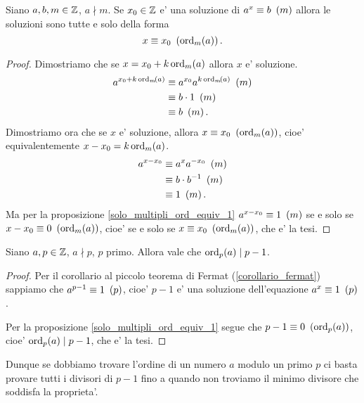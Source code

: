 \begin{proposition}
    Siano $a, b, m \in \Z$, $a \nmid m$. Se $x_0 \in \Z$ e' una soluzione di $a^x \equiv b \Mod{m}$ allora le soluzioni sono tutte e solo della forma \begin{equation}
        x \equiv x_0 \Mod{\ord{a}{m}}.
    \end{equation}
\end{proposition}
\begin{proof}
    Dimostriamo che se $x = x_0 + k\ord{a}{m}$ allora $x$ e' soluzione.
    \begin{alignat*}
        {1}
        a^{x_0 + k\ord{a}{m}} &\equiv a^{x_0}a^{k\ord{a}{m}} \Mod{m} \\
        &\equiv b \cdot 1 \Mod{m} \\
        &\equiv b \Mod{m}.
    \end{alignat*}
    Dimostriamo ora che se $x$ e' soluzione, allora $x \equiv x_0 \Mod{\ord{a}{m}}$, cioe' equivalentemente $x - x_0 = k\ord{a}{m}$.
    \begin{alignat*}
        {1}
        a^{x - x_0} &\equiv a^{x}a^{-x_0} \Mod{m} \\
        &\equiv b \cdot b^{-1} \Mod{m} \\
        &\equiv 1 \Mod{m}.
    \end{alignat*}
    Ma per la proposizione \ref{solo_multipli_ord_equiv_1} $a^{x - x_0} \equiv 1 \Mod{m}$ se e solo se $x - x_0 \equiv 0 \Mod{\ord{a}{m}}$, cioe' se e solo se $x \equiv x_0 \Mod{\ord{a}{m}}$, che e' la tesi.
\end{proof}

\begin{proposition}
    Siano $a, p \in \Z$, $a \nmid p$, $p$ primo. Allora vale che $\ord{a}{p} \divides p-1$.
\end{proposition}
\begin{proof}
    Per il corollario al piccolo teorema di Fermat (\ref{corollario_fermat}) sappiamo che $a^{p-1} \equiv 1 \Mod{p}$, cioe' $p-1$ e' una soluzione dell'equazione $a^x \equiv 1 \Mod{p}$. 
    
    Per la proposizione \ref{solo_multipli_ord_equiv_1} segue che $p-1 \equiv 0 \Mod{\ord{a}{p}}$, cioe' $\ord{a}{p} \mid p-1$, che e' la tesi.
\end{proof}

Dunque se dobbiamo trovare l'ordine di un numero $a$ modulo un primo $p$ ci basta provare tutti i divisori di $p - 1$ fino a quando non troviamo il minimo divisore che soddisfa la proprieta'.

